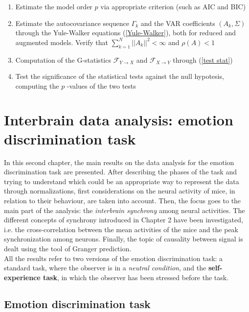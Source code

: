 \documentclass[12pt, a4paper]{article}
\begin{document}
\begin{enumerate}
	\item Estimate the model order $p$ via appropriate criterion (such as AIC and BIC)
	
	\item Estimate the autocovariance sequence $\Gamma_k$ and the VAR coefficients $(A_k, \Sigma)$ through the Yule-Walker equations (\ref*{Yule-Walker}), both for reduced and augmented models. Verify that $ \sum_{k=1}^{N}||A_k||^2 < \infty $ and  $\rho(A) < 1$
	
	\item Computation of the G-statistics $ \mathcal{F}_{Y \rightarrow X} $ and $ \mathcal{F}_{X \rightarrow Y} $ through (\ref{test stat})
	
	\item Test the significance of the statistical tests against the null hypotesis, computing the $p$ -values of the two tests 
	
\end{enumerate}





\newpage
\section{Interbrain data analysis: emotion discrimination task}

In this second chapter, the main results on the data analysis for the emotion discrimination task are presented. After describing the phases of the task and trying to understand which could be an appropriate way  to represent the data through normalizations, first considerations on the neural activity of mice, in relation to their behaviour, are taken into account. Then, the focus goes to the main part of the analysis: the \textit{interbrain synchrony} among neural activities. The different concepts of synchrony introduced in Chapter 2 have been investigated, i.e. the cross-correlation between the mean activities of the mice and the peak synchronization among neurons. Finally, the topic of causality between signal is dealt using the tool of Granger prediction.\\
All the results refer to two versions of the emotion discrimination task: a standard task, where the observer is in a \textit{neutral condition}, and the \textbf{self-experience task}, in which the observer has been stressed before the task.


\subsection{Emotion discrimination task}
\end{document}
